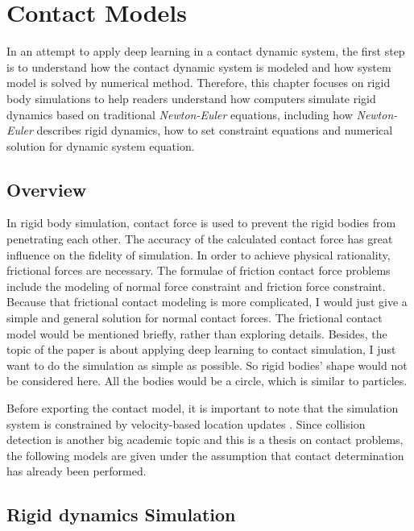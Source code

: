
\chapter{Contact Models}
\label{cp:contact}
In an attempt to apply deep learning in a contact dynamic system, the first step is to understand how the contact dynamic system is modeled and how system model is solved by numerical method. Therefore, this chapter focuses on rigid body simulations to help readers understand how computers simulate rigid dynamics based on traditional \textit{Newton-Euler} equations, including how \textit {Newton-Euler} describes rigid dynamics, how to set constraint equations and numerical solution for dynamic system equation.

\section{Overview}

In rigid body simulation, contact force is used to prevent the rigid bodies from penetrating each other. The accuracy of the calculated contact force has great influence on the fidelity of simulation. In order to achieve physical rationality, frictional forces are necessary. The formulae of friction contact force problems include the modeling of normal force constraint and friction force constraint. Because that frictional contact modeling is more complicated, I would just give a simple and general solution for normal contact forces. The frictional contact model would be mentioned briefly, rather than exploring details. Besides, the topic of the paper is about applying deep learning to contact simulation, I just want to do the simulation as simple as possible. So rigid bodies' shape would not be considered here. All the bodies would be a circle, which is similar to particles.

Before exporting the contact model, it is important to note that the simulation system is constrained by velocity-based location updates \cite{Erleben:2007:VSP:1243980.1243986}. Since collision detection is another big academic topic \cite{boulic2007collision} and this is a thesis on contact problems, the following models are given under the assumption that contact determination has already been performed.

\section{Rigid dynamics Simulation}

